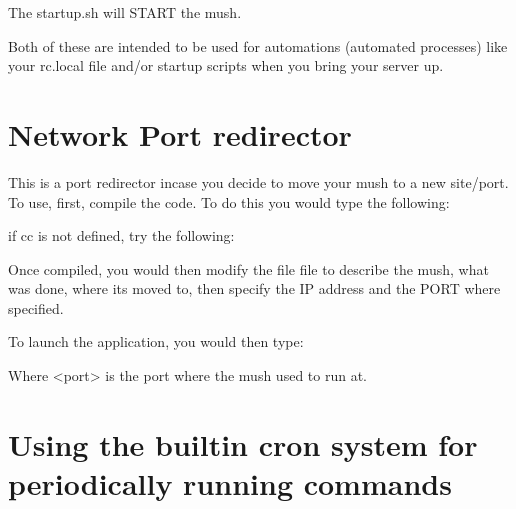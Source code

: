 \documentclass[letterpaper,10pt,english]{sphinxmanual}
\begin{document}
\sphinxAtStartPar
The \textquotesingle{}startup.sh\textquotesingle{} will START the mush.

\sphinxAtStartPar
Both of these are intended to be used for automations (automated processes)
like your rc.local file and/or startup scripts when you bring your server up.


\section{Network Port redirector}
\label{\detokenize{maintenance:network-port-redirector}}
\sphinxAtStartPar
This is a port redirector incase you decide to move your mush
to a new site/port.  To use, first, compile the code.  To do
this you would type the following:

\begin{sphinxVerbatim}[commandchars=\\\{\}]
   
\end{sphinxVerbatim}

\sphinxAtStartPar
if \textquotesingle{}cc\textquotesingle{} is not defined, try the following:

\begin{sphinxVerbatim}[commandchars=\\\{\}]
   
\end{sphinxVerbatim}

\sphinxAtStartPar
Once compiled, you would then modify the file \textquotesingle{}file\textquotesingle{} to describe
the mush, what was done, where it\textquotesingle{}s moved to, then specify the
IP address and the PORT where specified.

\sphinxAtStartPar
To launch the application, you would then type:

\begin{sphinxVerbatim}[commandchars=\\\{\}]
  
\end{sphinxVerbatim}

\sphinxAtStartPar
Where \textless{}port\textgreater{} is the port where the mush used to run at.


\section{Using the built\sphinxhyphen{}in cron system for periodically running commands}
\label{\detokenize{maintenance:using-the-built-in-cron-system-for-periodically-running-commands}}
\end{document}
